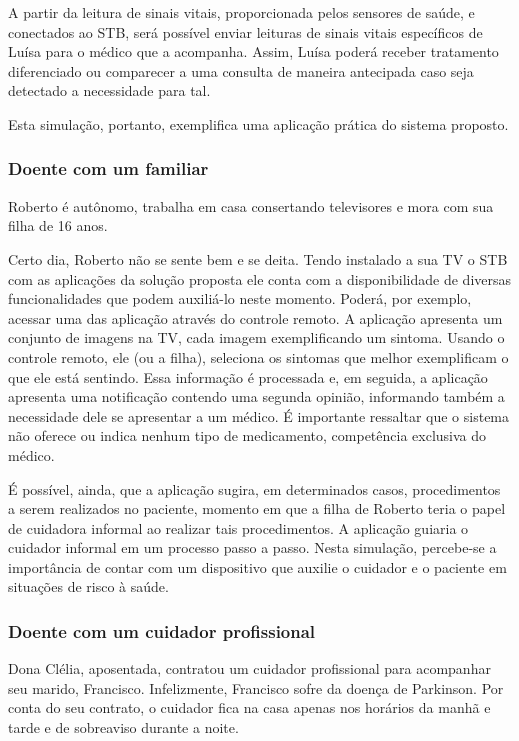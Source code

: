 A partir da leitura de sinais vitais, proporcionada pelos sensores de saúde,
e conectados ao STB, será possível enviar leituras de sinais vitais específicos 
de Luísa para o médico que a acompanha. Assim, Luísa poderá receber tratamento
diferenciado ou comparecer a uma consulta de maneira antecipada caso seja
detectado a necessidade para tal.

Esta simulação, portanto, exemplifica uma aplicação prática do sistema 
proposto.

\subsubsection{Doente com um familiar}

Roberto é autônomo, trabalha em casa consertando televisores e mora com sua
filha de 16 anos.

Certo dia, Roberto não se sente bem e se deita. Tendo instalado a sua TV o STB
com as aplicações da solução proposta ele conta com a disponibilidade de
diversas funcionalidades que podem auxiliá-lo neste momento. Poderá, por
exemplo, acessar uma das aplicação através do controle remoto. A aplicação
apresenta um conjunto de imagens na TV, cada imagem exemplificando um sintoma.
Usando o controle remoto, ele (ou a filha), seleciona os sintomas que melhor
exemplificam o que ele está sentindo. Essa informação é processada e, em
seguida, a aplicação apresenta uma notificação contendo uma segunda opinião,
informando também a necessidade dele se apresentar a um médico. É importante
ressaltar que o sistema não oferece ou indica nenhum tipo de medicamento,
competência exclusiva do médico.

É possível, ainda, que a aplicação sugira, em determinados casos, procedimentos a
serem realizados no paciente, momento em que a filha de Roberto teria o papel de
cuidadora informal ao realizar tais procedimentos. A aplicação guiaria o
cuidador informal em um processo passo a passo. Nesta simulação,  percebe-se a
importância de contar com um dispositivo que auxilie o cuidador e o paciente em
situações de risco à saúde.

\subsubsection{Doente com um cuidador profissional}

Dona Clélia, aposentada, contratou um cuidador profissional para acompanhar seu
marido, Francisco. Infelizmente, Francisco sofre da doença de Parkinson. Por conta
do seu contrato, o cuidador fica na casa apenas nos horários da manhã e tarde e 
de sobreaviso durante a noite.

